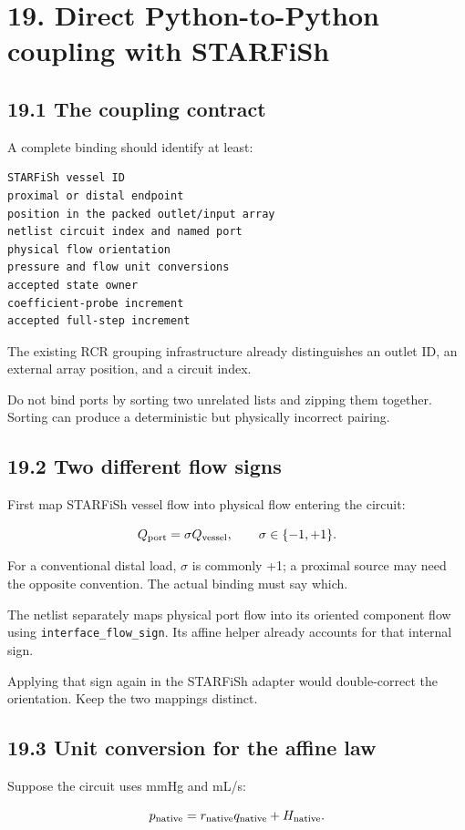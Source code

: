 \documentclass[11pt,a4paper]{article}
\begin{document}
\clearpage
\section{19. Direct Python-to-Python coupling with STARFiSh}
\subsection{19.1 The coupling contract}
A complete binding should identify at least:


\begin{lstlisting}
STARFiSh vessel ID
proximal or distal endpoint
position in the packed outlet/input array
netlist circuit index and named port
physical flow orientation
pressure and flow unit conversions
accepted state owner
coefficient-probe increment
accepted full-step increment
\end{lstlisting}
The existing RCR grouping infrastructure already distinguishes an outlet ID, an external array position, and a circuit index.

Do not bind ports by sorting two unrelated lists and zipping them together. Sorting can produce a deterministic but physically incorrect pairing.

\subsection{19.2 Two different flow signs}
First map STARFiSh vessel flow into physical flow entering the circuit:


\begingroup\small
\[
Q_{\rm port}=\sigma Q_{\rm vessel},
\qquad \sigma\in\{-1,+1\}.
\]
\endgroup


For a conventional distal load, \(\sigma\) is commonly +1; a proximal source may need the opposite convention. The actual binding must say which.

The netlist separately maps physical port flow into its oriented component flow using \texttt{interface\_\allowbreak{}flow\_\allowbreak{}sign}. Its affine helper already accounts for that internal sign.

Applying that sign again in the STARFiSh adapter would double-correct the orientation. Keep the two mappings distinct.

\subsection{19.3 Unit conversion for the affine law}
Suppose the circuit uses mmHg and mL/s:


\begingroup\small
\[
p_{\rm native}=r_{\rm native}q_{\rm native}+H_{\rm native}.
\]
\endgroup
\end{document}
